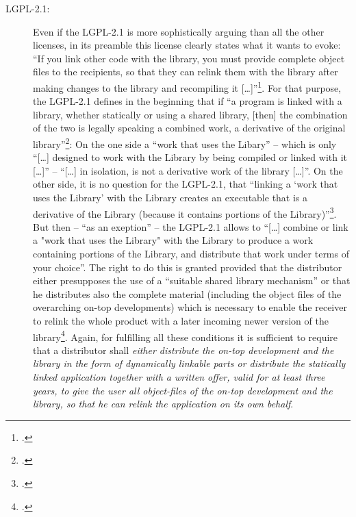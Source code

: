 \begin{description}
  \item[LGPL-2.1:] Even if the LGPL-2.1 is more sophistically arguing than all
  the other licenses, in its preamble this license clearly states what it wants
  to evoke: \enquote{If you link other code with the library, you must provide
  complete object files to the recipients, so that they can relink them with the
  library after making changes to the library and recompiling it
  [\ldots]}\footcite[cf.][\nopage wp.\ preamble]{Lgpl21OsiLicense1999a}. For
  that purpose, the LGPL-2.1 defines in the beginning that if \enquote{a program
  is linked with a library, whether statically or using a shared library, [then]
  the combination of the two is legally speaking a combined work, a derivative
  of the original library}\footcite[cf.][\nopage wp.\
  preamble]{Lgpl21OsiLicense1999a}: On the one side a \enquote{work that uses
  the Libary} -- which is only \enquote{[\ldots] designed to work with the
  Library by being compiled or linked with it [\ldots]} -- \enquote{[\ldots] in
  isolation, is not a derivative work of the library [\ldots]}. On the other
  side, it is no question for the LGPL-2.1, that \enquote{linking a
  \enquote{work that uses the Library} with the Library creates an executable
  that is a derivative of the Library (because it contains portions of the
  Library)}\footcite[cf.][\nopage wp.\ §5]{Lgpl21OsiLicense1999a}. But then --
  \enquote{as an exeption} -- the LGPL-2.1 allows to \enquote{[\ldots] combine
  or link a "work that uses the Library" with the Library to produce a work
  containing portions of the Library, and distribute that work under terms of
  your choice}. The right to do this is granted provided that the distributor
  either presupposes the use of a \enquote{suitable shared library mechanism} or
  that he distributes also the complete material (including the object files of
  the overarching on-top developments) which is necessary to enable the receiver
  to relink the whole product with a later incoming newer version of the
  library\footcite[cf.][\nopage wp.\ §6, §6b and §6c together with
  §6c]{Lgpl21OsiLicense1999a}. Again, for fulfilling all these conditions it is
  sufficient to require that a distributor shall \emph{either distribute the
  on-top development and the library in the form of dynamically linkable parts
  or distribute the statically linked application together with a written offer,
  valid for at least three years, to give the user all object-files of the
  on-top development and the library, so that he can relink the application on
  its own behalf}.

\end{description}

